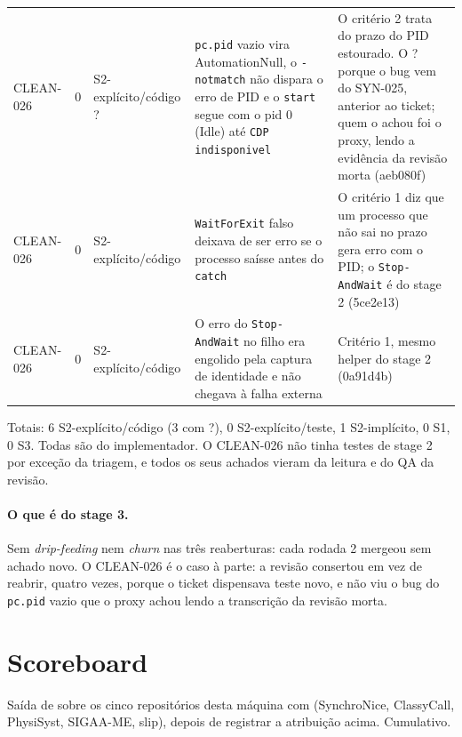 \documentclass[11pt,a4paper]{article}
\begin{document}
{\begin{longtable}{@{}l c >{\raggedright\arraybackslash}p{2.6cm} >{\raggedright\arraybackslash}p{5.0cm} >{\raggedright\arraybackslash}p{5.2cm}@{}}
CLEAN-026 & 0 & S2-explícito/código ? & \texttt{pc.pid} vazio vira AutomationNull, o \texttt{-notmatch} não dispara o erro de PID e o \texttt{start} segue com o pid 0 (Idle) até \texttt{CDP indisponivel} & O critério 2 trata do prazo do PID estourado. O ? porque o bug vem do SYN-025, anterior ao ticket; quem o achou foi o proxy, lendo a evidência da revisão morta (aeb080f)\\
CLEAN-026 & 0 & S2-explícito/código & \texttt{WaitForExit} falso deixava de ser erro se o processo saísse antes do \texttt{catch} & O critério 1 diz que um processo que não sai no prazo gera erro com o PID; o \texttt{Stop-AndWait} é do stage 2 (5ce2e13)\\
CLEAN-026 & 0 & S2-explícito/código & O erro do \texttt{Stop-AndWait} no filho era engolido pela captura de identidade e não chegava à falha externa & Critério 1, mesmo helper do stage 2 (0a91d4b)\\
\bottomrule
\end{longtable}}

Totais: 6 S2-explícito/código (3 com ?), 0 S2-explícito/teste, 1
S2-implícito, 0 S1, 0 S3. Todas são do implementador. O CLEAN-026 não tinha
testes de stage 2 por exceção da triagem, e todos os seus achados vieram da
leitura e do QA da revisão.

\paragraph{O que é do stage 3.} Sem \emph{drip-feeding} nem \emph{churn} nas
três reaberturas: cada rodada 2 mergeou sem achado novo. O CLEAN-026 é o caso
à parte: a revisão consertou em vez de reabrir, quatro vezes, porque o ticket
dispensava teste novo, e não viu o bug do \texttt{pc.pid} vazio que o proxy
achou lendo a transcrição da revisão morta.

\section{Scoreboard}

Saída de  sobre os cinco repositórios
desta máquina com  (SynchroNice, ClassyCall,
PhysiSyst, SIGAA-ME, slip), depois de registrar a atribuição acima.
Cumulativo.
\end{document}
